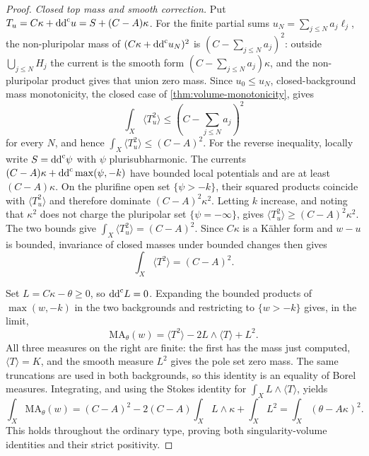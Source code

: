 \begin{proof}
\emph{Closed top mass and smooth correction.} Put
$T_u=C\kappa+\mathrm{dd}^{\mathrm{c}} u=S+(C-A)\kappa$.
For the finite partial sums $u_N=\sum_{j\leq N}a_j\ell_j$,
the non-pluripolar mass of $(C\kappa+\mathrm{dd}^{\mathrm{c}} u_N)^2$ is
$(C-\sum_{j\leq N}a_j)^2$: outside $\bigcup_{j\leq N}H_j$
the current is the smooth form $(C-\sum_{j\leq N}a_j)\kappa$, and the
non-pluripolar product gives that union zero mass. Since $u_0\leq u_N$,
closed-background mass monotonicity, the closed case of
\cref{thm:volume-monotonicity}, gives
\[
 \int_X\langle T_u^2\rangle
 \leq\left(C-\sum_{j\leq N}a_j\right)^2
\]
for every $N$, and hence $\int_X\langle T_u^2\rangle\leq(C-A)^2$.
For the reverse inequality, locally write $S=\mathrm{dd}^{\mathrm{c}}\psi$ with
$\psi$ plurisubharmonic. The currents
$(C-A)\kappa+\mathrm{dd}^{\mathrm{c}}\max(\psi,-k)$ have bounded local potentials
and are at least $(C-A)\kappa$.
On the plurifine open set $\{\psi>-k\}$, their squared products
coincide with $\langle T_u^2\rangle$ and therefore
dominate $(C-A)^2\kappa^2$. Letting $k$ increase, and noting
that $\kappa^2$ does not charge the pluripolar set $\{\psi=-\infty\}$, gives
$\langle T_u^2\rangle\geq(C-A)^2\kappa^2$.
The two bounds give $\int_X\langle T_u^2\rangle=(C-A)^2$.
Since $C\kappa$ is a K\"ahler form and $w-u$ is bounded,
invariance of closed masses under bounded changes then gives
\[
 \int_X\langle T^2\rangle=(C-A)^2.
\]

Set $L=C\kappa-\theta\geq0$, so $\mathrm{dd}^{\mathrm{c}} L=0$.
Expanding the bounded products of $\max(w,-k)$ in the two
backgrounds and restricting to $\{w>-k\}$ gives, in the limit,
\[
 \mathrm{MA}_\theta(w)
       =\langle T^2\rangle-2L\wedge\langle T\rangle+L^2.
\]
All three measures on the right are finite: the first
has the mass just computed, $\langle T\rangle=K$, and
the smooth measure $L^2$ gives the pole set zero mass.
The same truncations are used in both backgrounds, so this
identity is an equality of Borel measures.
Integrating, and using the Stokes identity for $\int_XL\wedge\langle T\rangle$, yields
\[
 \int_X\mathrm{MA}_\theta(w)
 =(C-A)^2-2(C-A)\int_XL\wedge\kappa+\int_XL^2
 =\int_X(\theta-A\kappa)^2.
\]
This holds throughout the ordinary type, proving both
singularity-volume identities and their strict positivity.
\end{proof}

